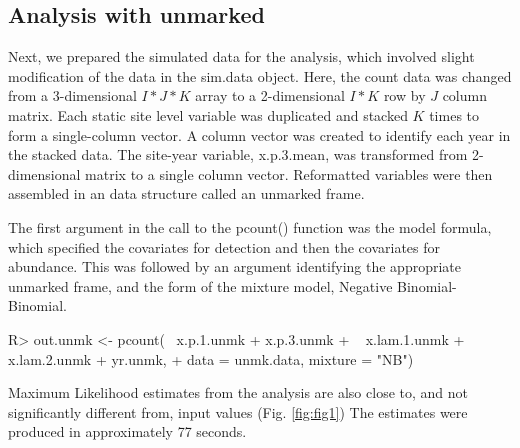 \documentclass[article]{jss}
\begin{document}
\subsection[Analysis with unmarked]{Analysis with unmarked}
Next, we prepared the simulated data for the  analysis, which involved slight modification of the data in the sim.data object. Here, the count data was changed from a 3-dimensional $I*J*K$ array to a 2-dimensional $I*K$ row by $J$ column matrix.  Each static site level variable was duplicated and stacked $K$ times to form a single-column vector. A column vector was created to identify each year in the stacked data. The site-year variable, x.p.3.mean, was transformed from 2-dimensional matrix to a single column vector. Reformatted variables were then assembled in an  data structure called an unmarked frame.


The first argument in the call to the pcount() function was the model formula, which specified the covariates for detection and then the covariates for abundance. This was followed by an argument identifying the appropriate unmarked frame, and the form of the mixture model, Negative Binomial-Binomial.

\begin{CodeInput}
R> out.unmk <- pcount(~ x.p.1.unmk + x.p.3.unmk
+                     ~ x.lam.1.unmk + x.lam.2.unmk + yr.unmk,
+                       data = unmk.data, mixture = "NB")
\end{CodeInput}

Maximum Likelihood estimates from the  analysis are also close to, and not significantly different from, input values (Fig. \ref{fig:fig1})  The  estimates were produced in approximately 77 seconds.
\end{document}
